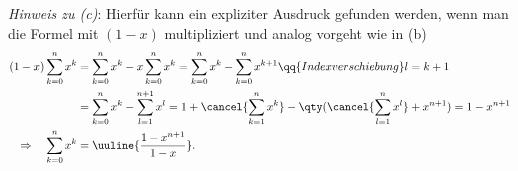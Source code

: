 \emph{Hinweis zu (c)}: Hierfür kann ein expliziter Ausdruck gefunden werden, wenn man die Formel mit $(1-x)$ multipliziert und analog vorgeht wie in (b) 
\begin{align*}
        (1-x) \sum_{k=0}^n x^k &= \sum_{k=0}^n x^k - x \sum_{k=0}^n x^k = \sum_{k=0}^n x^k - \sum_{k=0}^n x^{k+1} \qq{Indexverschiebung} l = k+1 \\
        &= \sum_{k=0}^n x^k - \sum_{l=1}^{n+1} x^l = 1 + \cancel{\sum_{k=1}^n x^k} - \qty(\cancel{\sum_{l=1}^n x^l} + x^{n+1}) = 1 - x^{n+1} \\
        \Rightarrow \quad \sum_{k=0}^n x^k &= \uuline{\frac{1 - x^{n+1}}{1-x}}.
\end{align*}